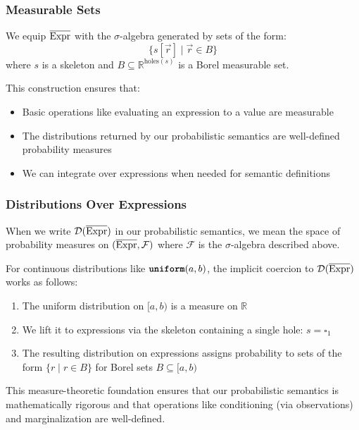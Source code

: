 \subsubsection{Measurable Sets}

We equip ${\overline{\textnormal{Expr}}}$ with the $\sigma$-algebra generated by sets of the form:
\[
\{s[\vec{r}] \mid \vec{r} \in B\}
\]
where $s$ is a skeleton and $B \subseteq \mathbb{R}^{\text{holes}(s)}$ is a Borel measurable set.

This construction ensures that:
\begin{itemize}
    \item Basic operations like evaluating an expression to a value are measurable
    \item The distributions returned by our probabilistic semantics are well-defined probability measures
    \item We can integrate over expressions when needed for semantic definitions
\end{itemize}

\subsubsection{Distributions Over Expressions}

When we write $\mathcal{D}({\overline{\textnormal{Expr}}})$ in our probabilistic semantics, we mean the space of probability measures on $({\overline{\textnormal{Expr}}}, \mathcal{F})$ where $\mathcal{F}$ is the $\sigma$-algebra described above.

For continuous distributions like $\textnormal{\ttfamily\bfseries uniform}(a, b)$, the implicit coercion to $\mathcal{D}({\overline{\textnormal{Expr}}})$ works as follows:
\begin{enumerate}
    \item The uniform distribution on $[a, b)$ is a measure on $\mathbb{R}$
    \item We lift it to expressions via the skeleton containing a single hole: $s = \square_1$
    \item The resulting distribution on expressions assigns probability to sets of the form $\{r \mid r \in B\}$ for Borel sets $B \subseteq [a, b)$
\end{enumerate}

This measure-theoretic foundation ensures that our probabilistic semantics is mathematically rigorous and that operations like conditioning (via observations) and marginalization are well-defined. 

